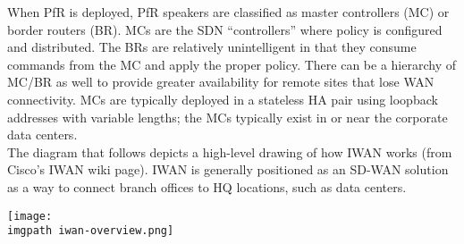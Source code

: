 When PfR is deployed, PfR speakers are classified as master controllers (MC)
or border routers (BR). MCs are the SDN ``controllers'' where policy is
configured and distributed. The BRs are relatively unintelligent in that they
consume commands from the MC and apply the proper policy. There can be a
hierarchy of MC/BR as well to provide greater availability for remote sites
that lose WAN connectivity. MCs are typically deployed in a stateless HA pair
using loopback addresses with variable lengths; the MCs typically exist in or
near the corporate data centers. \\

The diagram that follows depicts a high-level drawing of how IWAN works (from
Cisco’s IWAN wiki page). IWAN is generally positioned as an SD-WAN solution as
a way to connect branch offices to HQ locations, such as data centers.

    \begin{minipage}[t]{\linewidth}
	  \centering
      \texttt{[image: \\imgpath iwan-overview.png]}
    \end{minipage}

